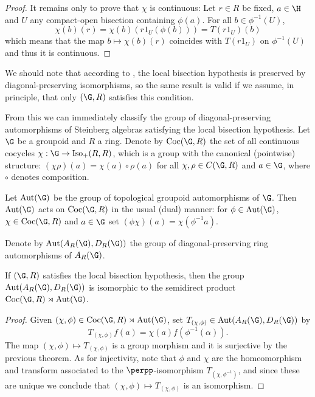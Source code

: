 \begin{proof}
It remains only to prove that $\chi$ is continuous: Let $r\in R$ be fixed, $a\in\H$ and $U$ any compact-open bisection containing $\phi(a)$. For all $b\in\phi^{-1}(U)$,
\[\chi(b)(r)=\chi(b)(r1_U(\phi(b)))=T(r1_U)(b)\]
which means that the map $b\mapsto\chi(b)(r)$ coincides with $T(r1_U)$ on $\phi^{-1}(U)$ and thus it is continuous.\qedhere
\end{proof}

We should note that according to \cite{MR3873946}, the local bisection hypothesis is preserved by diagonal-preserving isomorphisms, so the same result is valid if we assume, in principle, that only $(\G,R)$ satisfies this condition.

From this we can immediately classify the group of diagonal-preserving automorphisms of Steinberg algebras satisfying the local bisection hypothesis. Let $\G$ be a groupoid and $R$ a ring. Denote by $\operatorname{Coc}(\G,R)$ the set of all continuous cocycles $\chi:\G\to\operatorname{Iso}_+(R,R)$, which is a group with the canonical (pointwise) structure: $(\chi\rho)(a)=\chi(a)\circ\rho(a)$ for all $\chi,\rho\in C(\G,R)$ and $a\in\G$, where $\circ$ denotes composition.

Let $\operatorname{Aut}(\G)$ be the group of topological groupoid automorphisms of $\G$. Then $\operatorname{Aut}(\G)$ acts on $\operatorname{Coc}(\G,R)$ in the usual (dual) manner: for $\phi\in\operatorname{Aut}(\G)$, $\chi\in\operatorname{Coc}(\G,R)$ and $a\in\G$ set $(\phi\chi)(a)=\chi(\phi^{-1}a)$.

Denote by $\operatorname{Aut}(A_R(\G),D_R(\G))$ the group of diagonal-preserving ring automorphisms of $A_R(\G)$.

\begin{corollary}\label{corollaryclassificationofautomorphismsofsteinbergalgebras}
If $(\G,R)$ satisfies the local bisection hypothesis, then the group $\operatorname{Aut}(A_R(\G),D_R(\G))$ is isomorphic to the semidirect product $\operatorname{Coc}(\G,R)\rtimes\operatorname{Aut}(\G)$.
\end{corollary}
\begin{proof}
Given $(\chi,\phi)\in\operatorname{Coc}(\G,R)\rtimes\operatorname{Aut}(\G)$, set $T_{(\chi,\phi)}\in\operatorname{Aut}(A_R(\G),D_R(\G))$ by \[T_{(\chi,\phi)}f(a)=\chi(a)f(\phi^{-1}(\alpha)).\]
The map $(\chi,\phi)\mapsto T_{(\chi,\phi)}$ is a group morphism and it is surjective by the previous theorem. As for injectivity, note that $\phi$ and $\chi$ are the homeomorphism and transform associated to the $\perpp$-isomorphism $T_{(\chi,\phi^{-1})}$, and since these are unique we conclude that $(\chi,\phi)\mapsto T_{(\chi,\phi)}$ is an isomorphism.\qedhere
\end{proof}


